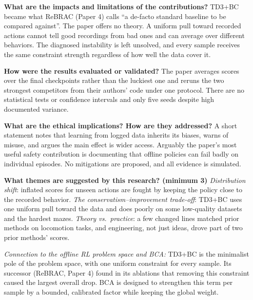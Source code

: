 \documentclass[11pt]{article}
\newcommand{\q}[2]{\item \textbf{#1} #2}
\newcommand{\tiein}[1]{\par\smallskip\noindent\emph{Connection to the offline RL problem space and BCA:} #1\par\medskip}
\begin{document}
\begin{qna}
\q{What are the impacts and limitations of the contributions?}
TD3+BC became what ReBRAC (Paper 4) calls ``a de-facto standard baseline to be compared against''. The paper offers no theory. A uniform pull toward recorded actions cannot tell good recordings from bad ones and can average over different behaviors. The diagnosed instability is left unsolved, and every sample receives the same constraint strength regardless of how well the data cover it.

\q{How were the results evaluated or validated?}
The paper averages scores over the final checkpoints rather than the luckiest one and reruns the two strongest competitors from their authors' code under one protocol. There are no statistical tests or confidence intervals and only five seeds despite high documented variance.

\q{What are the ethical implications? How are they addressed?}
A short statement notes that learning from logged data inherits its biases, warns of misuse, and argues the main effect is wider access. Arguably the paper's most useful safety contribution is documenting that offline policies can fail badly on individual episodes. No mitigations are proposed, and all evidence is simulated.

\q{What themes are suggested by this research? (minimum 3)}
\emph{Distribution shift}: inflated scores for unseen actions are fought by keeping the policy close to the recorded behavior. \emph{The conservatism--improvement trade-off}: TD3+BC uses one uniform pull toward the data and does poorly on some low-quality datasets and the hardest mazes. \emph{Theory vs.\ practice}: a few changed lines matched prior methods on locomotion tasks, and engineering, not just ideas, drove part of two prior methods' scores.

\end{qna}
\tiein{TD3+BC is the minimalist pole of the problem space, with one uniform constraint for every sample. Its successor (ReBRAC, Paper 4) found in its ablations that removing this constraint caused the largest overall drop. BCA is designed to strengthen this term per sample by a bounded, calibrated factor while keeping the global weight.}
\end{document}
